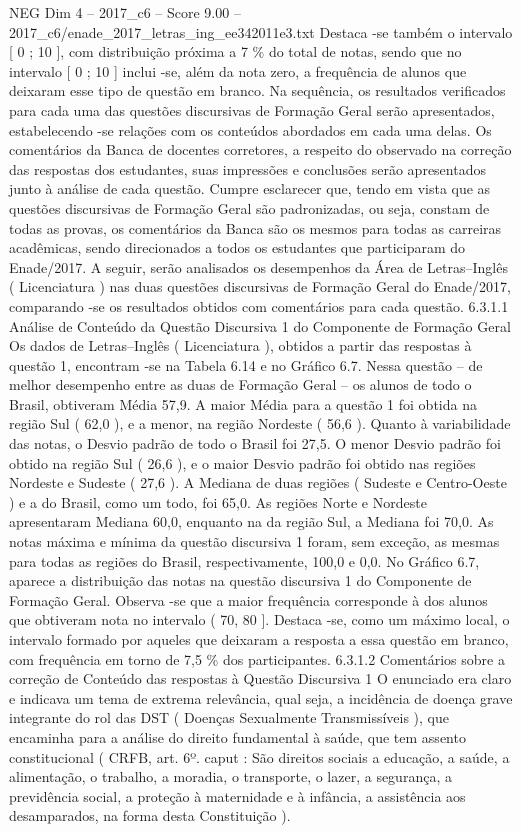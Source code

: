 \begin{textsample}{NEG Dim 4 – 2017\_c6 – Score 9.00 – 2017\_c6/enade\_2017\_letras\_ing\_ee342011e3.txt}
Destaca -se também o intervalo [ 0 ; 10 ], com distribuição próxima a 7 \% do total de notas, sendo que no intervalo [ 0 ; 10 ] inclui -se, além da nota zero, a frequência de alunos que deixaram esse tipo de questão em branco.
Na sequência, os resultados verificados para cada uma das questões discursivas de Formação Geral serão apresentados, estabelecendo -se relações com os conteúdos abordados em cada uma delas.
Os comentários da Banca de docentes corretores, a respeito do observado na correção das respostas dos estudantes, suas impressões e conclusões serão apresentados junto à análise de cada questão.
Cumpre esclarecer que, tendo em vista que as questões discursivas de Formação Geral são padronizadas, ou seja, constam de todas as provas, os comentários da Banca são os mesmos para todas as carreiras acadêmicas, sendo direcionados a todos os estudantes que participaram do Enade/2017.
A seguir, serão analisados os desempenhos da Área de Letras–Inglês ( Licenciatura ) nas duas questões discursivas de Formação Geral do Enade/2017, comparando -se os resultados obtidos com comentários para cada questão. 6.3.1.1 Análise de Conteúdo da Questão Discursiva 1 do Componente de Formação Geral Os dados de Letras–Inglês ( Licenciatura ), obtidos a partir das respostas à questão 1, encontram -se na Tabela 6.14 e no Gráfico 6.7.
Nessa questão – de melhor desempenho entre as duas de Formação Geral – os alunos de todo o Brasil, obtiveram Média 57,9.
A maior Média para a questão 1 foi obtida na região Sul ( 62,0 ), e a menor, na região Nordeste ( 56,6 ).
Quanto à variabilidade das notas, o Desvio padrão de todo o Brasil foi 27,5.
O menor Desvio padrão foi obtido na região Sul ( 26,6 ), e o maior Desvio padrão foi obtido nas regiões Nordeste e Sudeste ( 27,6 ).
A Mediana de duas regiões ( Sudeste e Centro-Oeste ) e a do Brasil, como um todo, foi 65,0.
As regiões Norte e Nordeste apresentaram Mediana 60,0, enquanto na da região Sul, a Mediana foi 70,0.
As notas máxima e mínima da questão discursiva 1 foram, sem exceção, as mesmas para todas as regiões do Brasil, respectivamente, 100,0 e 0,0.
No Gráfico 6.7, aparece a distribuição das notas na questão discursiva 1 do Componente de Formação Geral.
Observa -se que a maior frequência corresponde à dos alunos que obtiveram nota no intervalo ( 70, 80 ].
Destaca -se, como um máximo local, o intervalo formado por aqueles que deixaram a resposta a essa questão em branco, com frequência em torno de 7,5 \% dos participantes. 6.3.1.2 Comentários sobre a correção de Conteúdo das respostas à Questão Discursiva 1 O enunciado era claro e indicava um tema de extrema relevância, qual seja, a incidência de doença grave integrante do rol das DST ( Doenças Sexualmente Transmissíveis ), que encaminha para a análise do direito fundamental à saúde, que tem assento constitucional ( CRFB, art. 6º. caput : São direitos sociais a educação, a saúde, a alimentação, o trabalho, a moradia, o transporte, o lazer, a segurança, a previdência social, a proteção à maternidade e à infância, a assistência aos desamparados, na forma desta Constituição ).

\end{textsample}
